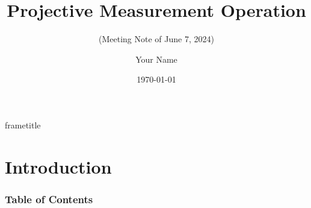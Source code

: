 \documentclass{beamer}
\title[]{Projective Measurement Operation}
\subtitle{(Meeting Note of June 7, 2024)}
\author[Your Name]{\Large Your Name}
\institute[]{\large Department of Computer Science \\Rutgers University}
\date{\today}
\begin{document}
\begin{frame}
    \maketitle
\end{frame}


{
    \nointerlineskip
    \begin{beamercolorbox}[wd=\paperwidth,ht=3.5ex,dp=2ex]{frametitle} %
        \hspace*{1ex} %
        \insertframetitle %
        \hfill %
        \hspace*{1ex} %
    \end{beamercolorbox}
}

\section{Introduction}


\begin{frame}
    \frametitle{Table of Contents}
    \tableofcontents
\end{frame}

\end{document}
